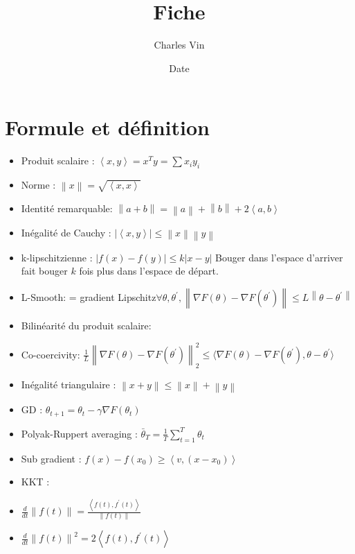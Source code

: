 \documentclass{article}
\title{Fiche}
\author{Charles Vin}
\date{Date}
\theoremstyle{plain}%
\theoremstyle{definition}
\theoremstyle{remark}
\begin{document}
\maketitle

\section{Formule et définition}
\begin{itemize}
    \item Produit scalaire : $ \left\langle x, y \right\rangle = x^T y = \sum x_i y_i $ 
    \item Norme : $ \left\| x \right\| = \sqrt{\left\langle x,x \right\rangle } $ 
    \item Identité remarquable: $ \left\| a + b \right\| = \left\| a \right\| + \left\| b \right\| + 2 \left\langle a,b \right\rangle  $ 
    \item Inégalité de Cauchy : $ \left| \left\langle x,y \right\rangle  \right| \leq \left\| x \right\| \left\| y \right\|   $ 
    \item k-lipschitzienne : $ \left| f(x) - f(y) \right| \leq k \left| x - y \right|  $ Bouger dans l'espace d'arriver fait bouger $ k $ fois plus dans l'espace de départ.
    \item L-Smooth: = gradient Lipschitz$ \forall \theta , \theta ^\prime, \left\| \nabla F(\theta ) - \nabla F(\theta ^\prime ) \right\| \leq  L \left\| \theta - \theta ^\prime  \right\| $ 
    \item Bilinéarité du produit scalaire: 
    \item Co-coercivity: $ \frac{1}{L} \left\| \nabla F(\theta ) - \nabla F(\theta ^\prime ) \right\| ^2 _2 \leq  \langle  \nabla F(\theta ) - \nabla F(\theta ^\prime ), \theta  - \theta ^\prime \rangle$ 
    \item Inégalité triangulaire : $ \left\| x + y \right\| \leq \left\| x \right\| + \left\| y \right\|  $ 
    \item GD : $ \theta _{t+1} = \theta _t - \gamma \nabla F(\theta _t) $ 
    \item Polyak-Ruppert averaging : $ \bar{\theta }_T = \frac{1}{T} \sum_{t=1}^{T}\theta _t $ 
    \item Sub gradient : $ f(x) - f(x_0) \geq \left\langle v, (x - x_0) \right\rangle  $ 
    \item KKT : 
    \item $ \frac{d}{dt} \left\| f(t) \right\| = \frac{\left\langle f(t) , f^\prime (t) \right\rangle }{\left\| f(t) \right\| } $ 
    \item $ \frac{d}{dt} \left\| f(t) \right\| ^2 = 2 \left\langle f(t) , f^\prime (t) \right\rangle $
\end{itemize}
\end{document}
